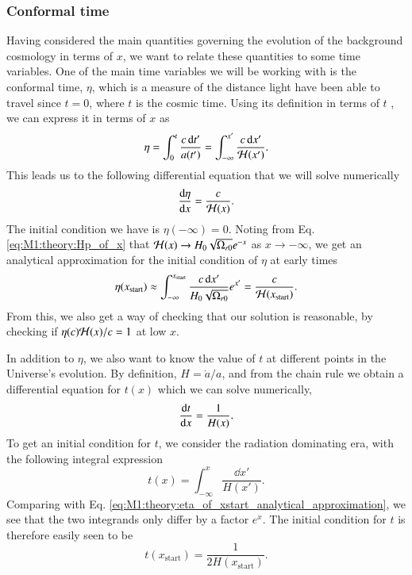 \subsubsection{Conformal time}
Having considered the main quantities governing the evolution of the background cosmology in terms of $x$, we want to relate these quantities to some time variables. One of the main time variables we will be working with is the conformal time, $\eta$, which is a measure of the distance light have been able to travel since $t=0$, where $t$ is the cosmic time. Using its definition in terms of $t$ \cite[Eq. (2.90)]{Dodelson}, we can express it in terms of $x$ as 
\begin{equation}
    \eta = \int_0^t \frac{c \, \dd t'}{a(t')} = \int_{-\infty}^{x'} \frac{c\,\dd x'}{\mathcal{H}(x')}. \label{eq:M1:theory:eta_of_x_integral_expression}
\end{equation}
%
This leads us to the following differential equation that we will solve numerically 
\begin{equation}
    \dv{\eta}{x} = \frac{c}{\mathcal{H}(x)}. \label{eq:M1:theory:eta_ODE}
\end{equation}
%
The initial condition we have is $\eta(-\infty)=0$. Noting from Eq. \eqref{eq:M1:theory:Hp_of_x} that $\mathcal{H}(x)\to H_0\sqrt{\Omega_{r0}}e^{-x}$ as $x\to-\infty$, we get an analytical approximation for the initial condition of $\eta$ at early times 
\begin{align}
    \eta(x_\mathrm{start}) \approx \int_{-\infty}^{x_\mathrm{start}} \frac{c\,\dd x'}{H_0\sqrt{\Omega_{r0}}} e^{x'} = \frac{c}{\mathcal{H}(x_\mathrm{start})}. \label{eq:M1:theory:eta_of_xstart_analytical_approximation}
\end{align} 
%
From this, we also get a way of checking that our solution is reasonable, by checking if $\eta(c)\mathcal{H}(x)/c=1$ at low $x$.    
% 

In addition to $\eta$, we also want to know the value of $t$ at different points in the Universe's evolution. By definition, $H=\dot{a}/a$, and from the chain rule we obtain a differential equation for $t(x)$ which we can solve numerically, 
\begin{equation}
    \dv{t}{x} = \frac{1}{H(x)}. \label{eq:M1:theory:cosmic_time_ODE}
\end{equation}
To get an initial condition for $t$, we consider the radiation dominating era, with the following integral expression 
\begin{equation}
    t(x) = \int_{-\infty}^x \frac{\dd x'}{H(x')}. \label{eq:M1:theory:t_of_x_integral_expression}
\end{equation} 
%
Comparing with Eq. \eqref{eq:M1:theory:eta_of_xstart_analytical_approximation}, we see that the two integrands only differ by a factor $e^x$. The initial condition for $t$ is therefore easily seen to be  
\begin{equation}
    t(x_\mathrm{start}) = \frac{1}{2H(x_\mathrm{start})}. \label{eq:M1:theory:t_of_xstart_analytical_approximation}
\end{equation} 


